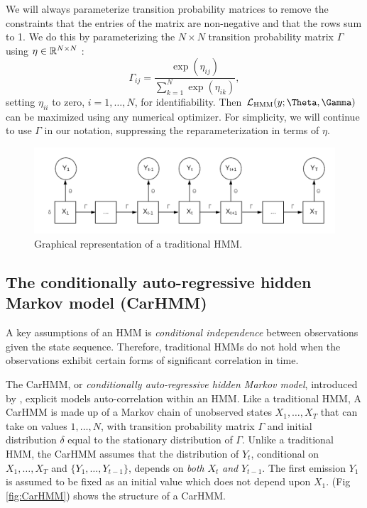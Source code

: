 We will always parameterize transition probability matrices to remove the constraints that the entries of the matrix are non-negative and that the rows sum to 1.  We do this by parameterizing the $N \times N$ transition probability matrix $\Gamma$ using $\eta \in \mathbb{R}^{N \times N}$ \citep{Barajas:2017}:
%
\[
\Gamma_{ij} = \frac{\exp(\eta_{ij})}{\sum_{k=1}^N \exp(\eta_{ik})}, 
\]
%
setting $\eta_{ii}$  to zero, $i=1,\ldots, N$, for identifiability.  Then $\calL_{\text{HMM}}(y;\Theta,\Gamma)$ can be maximized using any numerical optimizer.  For simplicity, we will continue to use $\Gamma$ in our notation, suppressing the reparameterization in terms of  $\eta$.

\begin{figure}[ht]
	\centering
	\includegraphics[width=5in]{../Plots/HMM.png}
	\caption{Graphical representation of a traditional HMM.}
	\label{fig:HMM}
\end{figure}


\subsection{The conditionally auto-regressive hidden Markov model (CarHMM)}

A key assumptions of an HMM is \textit{conditional independence} between observations given the state sequence.  Therefore, traditional HMMs do not hold when the observations exhibit certain forms of significant correlation in time.

The CarHMM, or \textit{conditionally auto-regressive hidden Markov model}, introduced by \citep{Lawler:2019}, explicit models auto-correlation within an HMM. Like a traditional HMM, A CarHMM is made up of a Markov chain of unobserved states $X_1,\ldots, X_T$ that can take on values $1, \ldots, N$, with transition probability matrix $\Gamma$ and initial distribution $\delta$ equal to the stationary distribution of $\Gamma$. Unlike a traditional HMM, the CarHMM assumes that the distribution of $Y_t$, conditional on $X_1,\ldots, X_T$ and $ \{Y_1,\ldots, Y_{t-1}\}$, depends on \textit{both} $X_t$ \textit{and} $Y_{t-1}$. 
The first emission $Y_1$ is assumed to be fixed as an initial value which does not depend upon $X_1$. (Fig \ref{fig:CarHMM}) shows the structure of a CarHMM.


